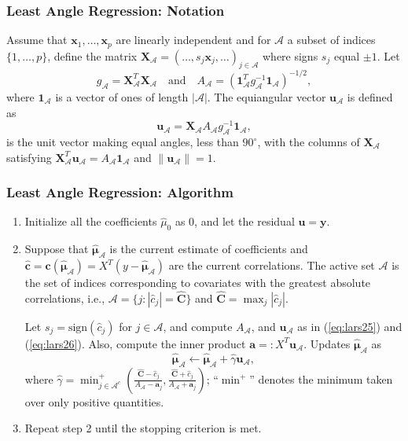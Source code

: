 \begin{frame}
\frametitle{Least Angle Regression: Notation}
Assume that $\mathbf{x}_1,\dots,\mathbf{x}_p$ are linearly independent and for $\mathcal{A}$ a subset of indices $\{1,\dots,p\}$, define the matrix $\mathbf{X}_\mathcal{A}={(\dots,s_j\mathbf{x}_j,\dots)}_{j\in\mathcal{A}}$ where signs $s_j$ equal $\pm 1$. Let
\begin{equation}
    g_\mathcal{A}=\mathbf{X}_\mathcal{A}^T\mathbf{X}_\mathcal{A}
    \quad \text{and} \quad
    A_\mathcal{A}={(\mathbf{1}^T_\mathcal{A}g^{-1}_\mathcal{A}\mathbf{1}_\mathcal{A})}^{-1/2},\label{eq:lars25}
\end{equation}
where $\mathbf{1}_\mathcal{A}$ is a vector of ones of length $|\mathcal{A}|$. The equiangular vector $\mathbf{u}_\mathcal{A}$ is defined as
\begin{equation}
    \mathbf{u}_\mathcal{A}=\mathbf{X}_\mathcal{A} A_\mathcal{A}g^{-1}_\mathcal{A}\mathbf{1}_\mathcal{A},\label{eq:lars26}
\end{equation}
is the unit vector making equal angles, less than $90^\circ$, with the columns of $\mathbf{X}_\mathcal{A}$ satisfying $\mathbf{X}_\mathcal{A}^T\mathbf{u}_\mathcal{A}=A_\mathcal{A}\mathbf{1}_\mathcal{A}$ and $\|\mathbf{u}_\mathcal{A}\|=1$.
\end{frame}

\begin{frame}
\frametitle{Least Angle Regression: Algorithm}
\begin{enumerate}
    \item Initialize all the coefficients $\hat{\mu}_0$ as 0, and let the residual $\mathbf{u}=\mathbf{y}$.
    \item Suppose that $\hat{\mathbf{\mu}}_\mathcal{A}$ is the current estimate of coefficients and $\hat{\mathbf{c}}=\mathbf{c}(\hat{\mathbf{\mu}}_\mathcal{A})=X^T(y-\hat{\mathbf{\mu}}_\mathcal{A})$ are the current correlations. The active set $\mathcal{A}$ is the set of indices corresponding to covariates with the greatest absolute correlations, i.e., $\mathcal{A}=\{j:|\hat{c}_j|=\hat{\mathbf{C}}\}$ and $\hat{\mathbf{C}}=\max_{j}|\hat{c}_j|$.
    
    Let $s_j=\text{sign}(\hat{c}_j)$ for $j\in\mathcal{A}$, and compute $A_\mathcal{A}$, and $\mathbf{u}_\mathcal{A}$ as in (\ref{eq:lars25}) and (\ref{eq:lars26}). Also, compute the inner product $\mathbf{a}=:X^T\mathbf{u}_\mathcal{A}$. Updates $\hat{\mathbf{\mu}}_\mathcal{A}$ as
    \begin{equation}\label{eq:lars212}
        \hat{\mathbf{\mu}}_\mathcal{A}\leftarrow\hat{\mathbf{\mu}}_\mathcal{A}+\hat{\gamma}\mathbf{u}_\mathcal{A},
    \end{equation}
    where $\hat{\gamma}=\min_{j\in\mathcal{A}^c}^+\left(\frac{\hat{\mathbf{C}}-\hat{c}_j}{A_\mathcal{A}-\mathbf{a}_j}, \frac{\hat{\mathbf{C}}+\hat{c}_j}{A_\mathcal{A}+\mathbf{a}_j}\right)$; ``$\min^+$'' denotes the minimum taken over only positive quantities.
    \item Repeat step 2 until the stopping criterion is met.
\end{enumerate}
    
\end{frame}

